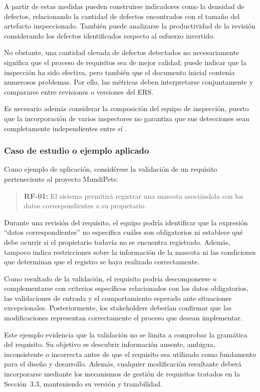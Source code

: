 \documentclass[journal,onecolumn]{IEEEtran}
\begin{document}
	A partir de estas medidas pueden construirse indicadores como la densidad de defectos, relacionando la cantidad de defectos encontrados con el tamaño del artefacto inspeccionado. También puede analizarse la productividad de la revisión considerando los defectos identificados respecto al esfuerzo invertido.
	
	No obstante, una cantidad elevada de defectos detectados no necesariamente significa que el proceso de requisitos sea de mejor calidad; puede indicar que la inspección ha sido efectiva, pero también que el documento inicial contenía numerosos problemas. Por ello, las métricas deben interpretarse conjuntamente y compararse entre revisiones o versiones del ERS.
	
	Es necesario además considerar la composición del equipo de inspección, puesto que la incorporación de varios inspectores no garantiza que sus detecciones sean completamente independientes entre sí \cite{Li2023}.
	
	\subsubsection{Caso de estudio o ejemplo aplicado}
	
	Como ejemplo de aplicación, considérese la validación de un requisito perteneciente al proyecto MundiPets:
	
	\begin{quote}
		\textbf{RF-01:} El sistema permitirá registrar una mascota asociándola con los datos correspondientes a su propietario.
	\end{quote}
	
	Durante una revisión del requisito, el equipo podría identificar que la expresión ``datos correspondientes'' no especifica cuáles son obligatorios ni establece qué debe ocurrir si el propietario todavía no se encuentra registrado. Además, tampoco indica restricciones sobre la información de la mascota ni las condiciones que determinan que el registro se haya realizado correctamente.
	
	Como resultado de la validación, el requisito podría descomponerse o complementarse con criterios específicos relacionados con los datos obligatorios, las validaciones de entrada y el comportamiento esperado ante situaciones excepcionales. Posteriormente, los stakeholders deberían confirmar que las modificaciones representan correctamente el proceso que desean implementar.
	
	Este ejemplo evidencia que la validación no se limita a comprobar la gramática del requisito. Su objetivo es descubrir información ausente, ambigua, inconsistente o incorrecta antes de que el requisito sea utilizado como fundamento para el diseño y desarrollo. Además, cualquier modificación resultante deberá incorporarse mediante los mecanismos de gestión de requisitos tratados en la Sección~3.3, manteniendo su versión y trazabilidad.
	
\end{document}
